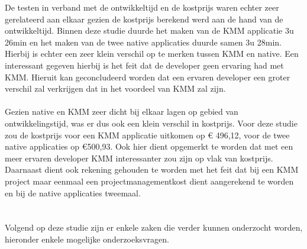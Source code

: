 De testen in verband met de ontwikkeltijd en de kostprijs waren echter zeer gerelateerd aan elkaar gezien de kostprijs berekend werd aan de hand van de ontwikkeltijd. Binnen deze studie duurde het maken van de KMM applicatie 3u 26min en het maken van de twee native applicaties duurde samen 3u 28min. Hierbij is echter een zeer klein verschil op te merken tussen KMM en native. Een interessant gegeven hierbij is het feit dat de developer geen ervaring had met KMM. Hieruit kan geconcludeerd worden dat een ervaren developer een groter verschil zal verkrijgen dat in het voordeel van KMM zal zijn.
\\ \\
Gezien native en KMM zeer dicht bij elkaar lagen op gebied van ontwikkelingstijd, was er dus ook een klein verschil in kostprijs. Voor deze studie zou de kostprijs voor een KMM applicatie uitkomen op \euro{} 496,12, voor de twee native applicaties op €500,93. Ook hier dient opgemerkt te worden dat met een meer ervaren developer KMM interessanter zou zijn op vlak van kostprijs. Daarnaast dient ook rekening gehouden te worden met het feit dat bij een KMM project maar eenmaal een projectmanagementkost dient aangerekend te worden en bij de native applicaties tweemaal.

\section{}
\label{sec:C-verder-onderzoek}
Volgend op deze studie zijn er enkele zaken die verder kunnen onderzocht worden, hieronder enkele mogelijke onderzoeksvragen.

